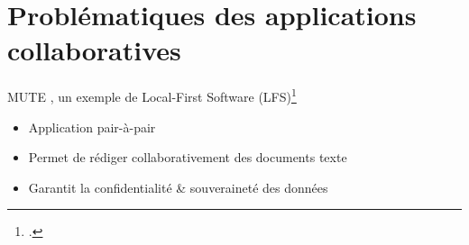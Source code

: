 \section{Problématiques des applications collaboratives}

\begin{frame}{MUTE , un exemple de Local-First Software (LFS)\footcite{localfirstsoftware2019}}
    \vspace{-0.5cm}
    \begin{figure}
    \end{figure}
    \vspace{-0.5cm}
    \begin{itemize}
        \item Application pair-à-pair
        \item Permet de rédiger collaborativement des documents texte
        \item Garantit la confidentialité \& souveraineté des données
    \end{itemize}
\end{frame}


